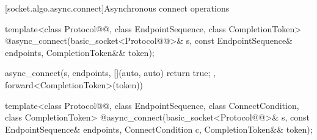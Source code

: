 [socket.algo.async.connect]{Asynchronous connect operations}

\begin{itemdecl}
template<class Protocol@@, class EndpointSequence, class CompletionToken>
  @\DEDUCED@ async_connect(basic_socket<Protocol@@>& s,
                        const EndpointSequence& endpoints,
                        CompletionToken&& token);
\end{itemdecl}

\begin{itemdescr}
\pnum
\returns
\begin{codeblock}
async_connect(s, endpoints, [](auto, auto){ return true; }, forward<CompletionToken>(token))
\end{codeblock}
\end{itemdescr}

\begin{itemdecl}
template<class Protocol@@, class EndpointSequence,
  class ConnectCondition, class CompletionToken>
    @\DEDUCED@ async_connect(basic_socket<Protocol@@>& s,
                          const EndpointSequence& endpoints,
                          ConnectCondition c,
                          CompletionToken&& token);
\end{itemdecl}

